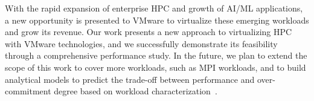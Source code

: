 With the rapid expansion of enterprise HPC and growth of AI/ML applications, a new opportunity is presented to VMware 
to virtualize these emerging workloads and grow its revenue. 
Our work presents a new approach to virtualizing HPC with VMware technologies, and we successfully demonstrate its feasibility through a comprehensive performance study. In the future, 
we plan to extend the scope of this work to cover more workloads, such as MPI workloads, and to build 
analytical models to predict the trade-off between performance and over-commitment degree based on 
workload characterization~\cite{arlitt1997internet,234855}.
